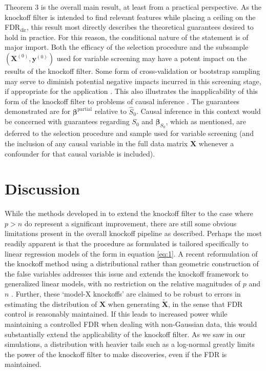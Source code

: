 \documentclass[]{scrartcl}
\newcommand{\1}[1]{\mathbbm{1}_{\left\{#1\right\}}}
\begin{document}
\noindent
Theorem 3 is the overall main result, at least from a practical perspective. As the knockoff filter is intended to find relevant features while placing a ceiling on the FDR$_{\text{dir}}$, this result most directly describes the theoretical guarantees desired to hold in practice. For this reason, the conditional nature of the statement is of major import. Both the efficacy of the selection procedure and the subsample $(\mathbf{X}^{(0)}, \mathbf{y}^{(0)})$ used for variable screening may have a potent impact on the results of the knockoff filter. Some form of cross-validation or bootstrap sampling may serve to diminish potential negative impacts incurred in this screening stage, if appropriate for the application \cite{rndlso}. This also illustrates the inapplicability of this form of the knockoff filter to problems of causal inference \cite{kohd}. The guarantees demonstrated are for $\pmb{\beta}^{\text{partial}}$ relative to $\widehat{S}_{0}$. Causal inference in this context would be concerned with guarantees regarding $S_{0}$ and $\pmb{\beta}_{S_{0}}$, which as mentioned, are deferred to the selection procedure and sample used for variable screening (and the inclusion of any causal variable in the full data matrix $\mathbf{X}$ whenever a confounder for that causal variable is included). 
\section{Discussion}
While the methods developed in \cite{kohd} to extend the knockoff filter to the case where $p > n$ do represent a significant improvement, there are still some obvious limitations present in the overall knockoff pipeline as described. Perhaps the most readily apparent is that the procedure as formulated is tailored specifically to linear regression models of the form in equation \eqref{eq:1}. A recent reformulation of the knockoff method using a distributional rather than geometric construction of the false variables addresses this issue and extends the knockoff framework to generalized linear models, with no restriction on the relative magnitudes of $p$ and $n$ \cite{komx}. Further, these `model-X knockoffs' are claimed to be robust to errors in estimating the distribution of $\mathbf{X}$ when generating $\widetilde{\mathbf{X}}$, in the sense that FDR control is reasonably maintained. If this leads to increased power while maintaining a controlled FDR when dealing with non-Gaussian data, this would substantially extend the applicability of the knockoff filter. As we saw in our simulations, a distribution with heavier tails such as a log-normal greatly limits the power of the knockoff filter to make discoveries, even if the FDR is maintained.
\end{document}
